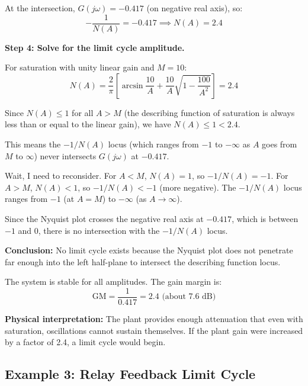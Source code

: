 \begin{example}
At the intersection, $G(j\omega) = -0.417$ (on negative real axis), so:
\begin{equation}
-\frac{1}{N(A)} = -0.417 \implies N(A) = 2.4
\end{equation}

\textbf{Step 4: Solve for the limit cycle amplitude.}

For saturation with unity linear gain and $M = 10$:
\begin{equation}
N(A) = \frac{2}{\pi}\left[\arcsin\frac{10}{A} + \frac{10}{A}\sqrt{1-\frac{100}{A^2}}\right] = 2.4
\end{equation}

Since $N(A) \leq 1$ for all $A > M$ (the describing function of saturation is always less than or equal to the linear gain), we have $N(A) \leq 1 < 2.4$.

This means the $-1/N(A)$ locus (which ranges from $-1$ to $-\infty$ as $A$ goes from $M$ to $\infty$) never intersects $G(j\omega)$ at $-0.417$.

Wait, I need to reconsider. For $A < M$, $N(A) = 1$, so $-1/N(A) = -1$. For $A > M$, $N(A) < 1$, so $-1/N(A) < -1$ (more negative). The $-1/N(A)$ locus ranges from $-1$ (at $A = M$) to $-\infty$ (as $A \to \infty$).

Since the Nyquist plot crosses the negative real axis at $-0.417$, which is between $-1$ and $0$, there is no intersection with the $-1/N(A)$ locus.

\textbf{Conclusion:} No limit cycle exists because the Nyquist plot does not penetrate far enough into the left half-plane to intersect the describing function locus.

The system is stable for all amplitudes. The gain margin is:
\begin{equation}
\text{GM} = \frac{1}{0.417} = 2.4 \text{ (about 7.6 dB)}
\end{equation}

\textbf{Physical interpretation:} The plant provides enough attenuation that even with saturation, oscillations cannot sustain themselves. If the plant gain were increased by a factor of 2.4, a limit cycle would begin.
\end{example}

\subsection{Example 3: Relay Feedback Limit Cycle}

